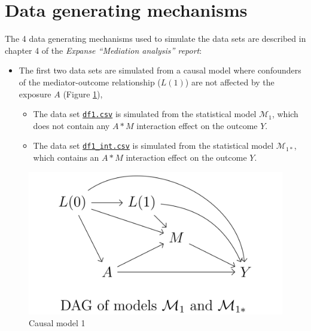 \documentclass[
]{book}
\providecommand{\tightlist}{%
  \setlength{\itemsep}{0pt}\setlength{\parskip}{0pt}}
\begin{document}
\section{Data generating mechanisms}\label{data-generating-mechanisms}

The 4 data generating mechanisms used to simulate the data sets are described in chapter 4 of the \emph{Expanse ``Mediation analysis'' report}:

\begin{itemize}
\tightlist
\item
  The first two data sets are simulated from a causal model where confounders of the mediator-outcome relationship (\(L(1)\)) are not affected by the exposure \(A\) (Figure \ref{fig:figDAGM1}),

  \begin{itemize}
  \tightlist
  \item
    The data set \href{https://github.com/benoitlepage/mediation_workshop/blob/main/data/df1.csv}{\texttt{df1.csv}} is simulated from the statistical model \(\mathcal{M}_1\), which does not contain any \(A \ast M\) interaction effect on the outcome \(Y\).
  \item
    The data set \href{https://github.com/benoitlepage/mediation_workshop/blob/main/data/df1_int.csv}{\texttt{df1\_int.csv}} is simulated from the statistical model \(\mathcal{M}_{1 \ast}\), which contains an \(A \ast M\) interaction effect on the outcome \(Y\).
  \end{itemize}
\end{itemize}

\begin{figure}

{\centering \includegraphics[width=0.5\linewidth]{./figures/DAG_M1} 

}

\caption{Causal model 1}\label{fig:figDAGM1}
\end{figure}
\end{document}
